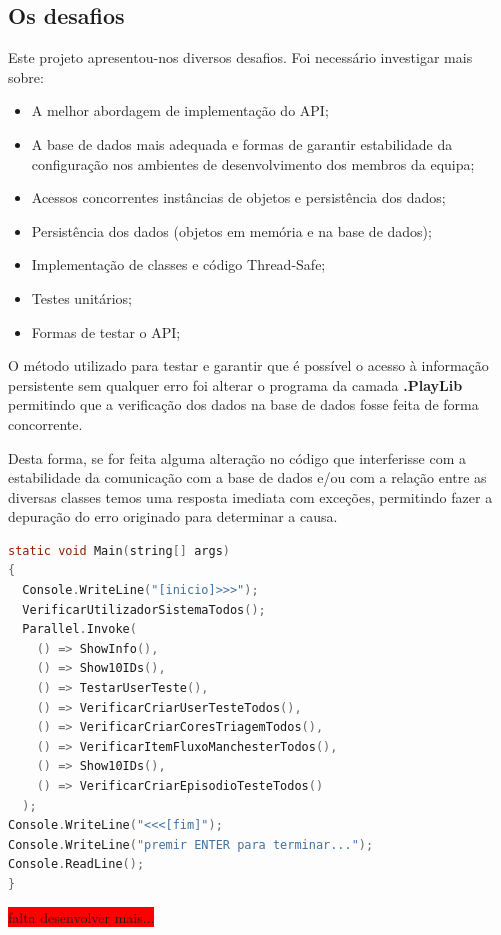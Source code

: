 
\subsection{Os desafios}

Este projeto apresentou-nos diversos desafios. Foi necessário investigar mais sobre:
\begin{itemize}
	\item A melhor abordagem de implementação do API;
	\item A base de dados mais adequada e formas de garantir estabilidade da configuração nos ambientes de desenvolvimento dos membros da equipa;
	\item Acessos concorrentes instâncias de objetos e persistência dos dados;
	\item Persistência dos dados (objetos em memória e na base de dados);
	\item Implementação de classes e código Thread-Safe;
	\item Testes unitários;
	\item Formas de testar o API;
\end{itemize}
 
O método utilizado para testar e garantir que é possível o acesso à informação persistente sem qualquer erro foi alterar o programa da camada \textbf{.PlayLib} permitindo que a verificação dos dados na base de dados fosse feita de forma concorrente. 

Desta forma, se for feita alguma alteração no código que interferisse com a estabilidade da comunicação com a base de dados e/ou com a relação entre as diversas classes temos uma resposta imediata com exceções, permitindo fazer a depuração do erro originado para determinar a causa.

\begin{lstlisting}[language={c},
	caption={Código principal da camada \textbf{.PlayLib}},
	label=lst:mainPlayLib]
static void Main(string[] args)
{
  Console.WriteLine("[inicio]>>>");
  VerificarUtilizadorSistemaTodos();
  Parallel.Invoke(
    () => ShowInfo(), 
    () => Show10IDs(),
    () => TestarUserTeste(), 
    () => VerificarCriarUserTesteTodos(), 
    () => VerificarCriarCoresTriagemTodos(), 
    () => VerificarItemFluxoManchesterTodos(),
    () => Show10IDs(),
    () => VerificarCriarEpisodioTesteTodos()
  );
Console.WriteLine("<<<[fim]");
Console.WriteLine("premir ENTER para terminar...");
Console.ReadLine();
}
\end{lstlisting}
 
\colorbox{red}{\Large falta desenvolver mais...}


